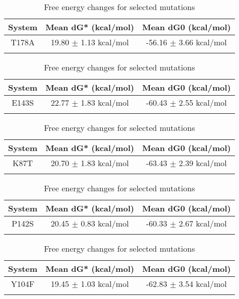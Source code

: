 \documentclass{article}
\begin{document}
\begin{table}[ht]
    \centering
    \begin{tabular}{|c|c|c|}
    \hline
    System & Mean dG* (kcal/mol) & Mean dG0 (kcal/mol) \\
    \hline
        T178A & 19.80 $\pm$ 1.13 kcal/mol & -56.16 $\pm$ 3.66 kcal/mol \\ \\
    \hline
    \end{tabular}
    \caption{Free energy changes for selected mutations}
\end{table}
\begin{table}[ht]
    \centering
    \begin{tabular}{|c|c|c|}
    \hline
    System & Mean dG* (kcal/mol) & Mean dG0 (kcal/mol) \\
    \hline
        E143S & 22.77 $\pm$ 1.83 kcal/mol & -60.43 $\pm$ 2.55 kcal/mol \\ \\
    \hline
    \end{tabular}
    \caption{Free energy changes for selected mutations}
\end{table}
\begin{table}[ht]
    \centering
    \begin{tabular}{|c|c|c|}
    \hline
    System & Mean dG* (kcal/mol) & Mean dG0 (kcal/mol) \\
    \hline
        K87T & 20.70 $\pm$ 1.83 kcal/mol & -63.43 $\pm$ 2.39 kcal/mol \\ \\
    \hline
    \end{tabular}
    \caption{Free energy changes for selected mutations}
\end{table}
\begin{table}[ht]
    \centering
    \begin{tabular}{|c|c|c|}
    \hline
    System & Mean dG* (kcal/mol) & Mean dG0 (kcal/mol) \\
    \hline
        P142S & 20.45 $\pm$ 0.83 kcal/mol & -60.33 $\pm$ 2.67 kcal/mol \\ \\
    \hline
    \end{tabular}
    \caption{Free energy changes for selected mutations}
\end{table}
\begin{table}[ht]
    \centering
    \begin{tabular}{|c|c|c|}
    \hline
    System & Mean dG* (kcal/mol) & Mean dG0 (kcal/mol) \\
    \hline
        Y104F & 19.45 $\pm$ 1.03 kcal/mol & -62.83 $\pm$ 3.54 kcal/mol \\ \\
    \hline
    \end{tabular}
    \caption{Free energy changes for selected mutations}
\end{table}
\end{document}

